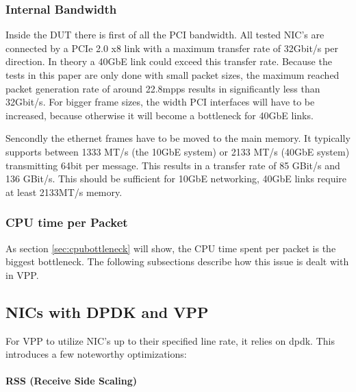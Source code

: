 
\subsubsection{Internal Bandwidth}


Inside the DUT there is first of all the PCI bandwidth. All tested
NIC's are connected by a PCIe 2.0 x8 link with a maximum transfer rate
of 32Gbit/s per direction. In theory a 40GbE link could exceed this
transfer rate. Because the tests in this paper are only done with
small packet sizes, the maximum reached packet generation rate of
around 22.8mpps results in significantly less than 32Gbit/s. For
bigger frame sizes, the width PCI interfaces will have to be
increased, because otherwise it will become a bottleneck for
40GbE links.


Sencondly the ethernet frames have to be moved to the main memory. It
typically supports between 1333 MT/s (the 10GbE system) or 2133 MT/s
(40GbE system) transmitting 64bit per message. This results in a
transfer rate of 85 GBit/s and 136 GBit/s. This should be sufficient
for 10GbE networking, 40GbE links require at least 2133MT/s memory.

\subsubsection{CPU time per Packet}

As section \ref{sec:cpubottleneck} will show, the CPU time spent per
packet is the biggest bottleneck. The following subsections describe
how this issue is dealt with in VPP.




\subsection{NICs with DPDK and VPP}

For VPP to utilize NIC's up to their specified line rate, it relies on
\Ac{dpdk}. This introduces a few noteworthy optimizations:

\paragraph{RSS (Receive Side Scaling)}
\label{sec:rss}

